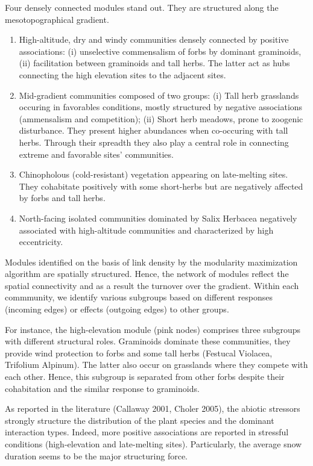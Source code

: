 \documentclass[10pt,a4paper]{article}
\begin{document}
Four densely connected modules stand out. They are structured along the mesotopographical gradient. 
\begin{enumerate}
	\item High-altitude, dry and windy communities densely connected by positive associations: (i) unselective commensalism of forbs by dominant graminoids, (ii) facilitation between graminoids and tall herbs. The latter act as hubs connecting the high elevation sites to the adjacent sites. 
	\item Mid-gradient communities composed of two groups: (i) Tall herb grasslands occuring in favorables conditions, mostly structured by negative associations (ammensalism and competition); (ii) Short herb meadows, prone to zoogenic disturbance. They present higher abundances when co-occuring with tall herbs. Through their spreadth they also play a central role in connecting extreme and favorable sites' communities. 
	\item Chinopholous (cold-resistant) vegetation appearing on late-melting sites. They cohabitate positively with some short-herbs but are negatively affected by forbs and tall herbs. 
	\item North-facing isolated communities dominated by Salix Herbacea negatively associated with high-altitude communities and characterized by high eccentricity.
\end{enumerate}

Modules identified on the basis of link density by the modularity maximization algorithm are spatially structured. Hence, the network of modules reflect the spatial connectivity and as a result the turnover over the gradient. Within each commmunity, we identify various subgroups based on different responses (incoming edges) or effects (outgoing edges) to other groups. 

For instance, the high-elevation module (pink nodes) comprises three subgroups with different structural roles. Graminoids dominate these communities, they provide wind protection to forbs and some tall herbs (Festucal Violacea, Trifolium Alpinum). The latter also occur on grasslands where they compete with each other. Hence, this subgroup is separated from other forbs despite their cohabitation and the similar response to graminoids. 

As reported in the literature (Callaway 2001, Choler 2005), the abiotic stressors strongly structure the distribution of the plant species and the dominant interaction types. Indeed, more positive associations are reported in stressful conditions (high-elevation and late-melting sites). Particularly, the average snow duration seems to be the major structuring force. 
     
\end{document}
